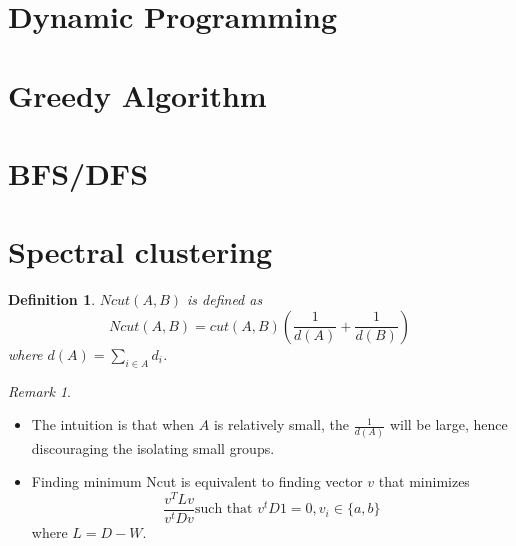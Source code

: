 \documentclass{article}
\newtheorem{definition}{Definition}
\theoremstyle{remark}
\newtheorem{remark}[example]{Remark}
\begin{document}
\section{Dynamic Programming}

\section{Greedy Algorithm}

\section{BFS/DFS}



\section*{Spectral clustering}
\begin{definition}
$Ncut(A,B)$ is defined as $$Ncut(A,B) = cut(A,B)(\frac 1{d(A)}+\frac 1{d(B)})$$ where $d(A)=\sum_{i\in A}d_i$.
\end{definition}
\begin{remark}
\begin{itemize}
\item The intuition is that when $A$ is relatively small, the $\frac 1{d(A)}$ will be large, hence discouraging the isolating small groups.
\item Finding minimum Ncut is equivalent to finding vector $v$ that minimizes $$\frac{v^T Lv}{v^tDv}\text{such that }v^tD1=0,v_i\in\{a,b\}$$ where 
$L=D-W$.

\end{itemize}
\end{remark}
\end{document}

